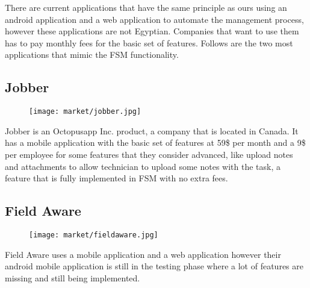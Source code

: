 There are current applications that have the same principle as ours using an android application and a web application to automate the management process, however these applications are not Egyptian. Companies that want to use them has to pay monthly fees for the basic set of features. Follows are the two most applications that mimic the FSM functionality.

\subsection{Jobber}
	\begin{figure}[ht]
		\centering
		\texttt{[image: market/jobber.jpg]}
	\end{figure}
	Jobber is an Octopusapp Inc. product, a company that is located in Canada. It has a mobile application with the basic set of features at 59\$ per month and a 9\$ per employee for some features that they consider advanced, like upload notes and attachments to allow technician to upload some notes with the task, a feature that is fully implemented in FSM with no extra fees.
\subsection{Field Aware}
	\begin{figure}[ht]
		\centering
		\texttt{[image: market/fieldaware.jpg]}
	\end{figure}
	Field Aware uses a mobile application and a web application however their android mobile application is still in the testing phase where a lot of features are missing and still being implemented.